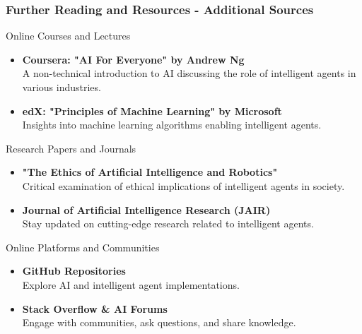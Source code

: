 \documentclass[aspectratio=169]{beamer}
\begin{document}
\begin{frame}[fragile]
  \frametitle{Further Reading and Resources - Additional Sources}
  
  \begin{block}{Online Courses and Lectures}
    \begin{itemize}
      \item \textbf{Coursera: "AI For Everyone" by Andrew Ng} \\
      A non-technical introduction to AI discussing the role of intelligent agents in various industries.
      
      \item \textbf{edX: "Principles of Machine Learning" by Microsoft} \\
      Insights into machine learning algorithms enabling intelligent agents.
    \end{itemize}
  \end{block}

  \begin{block}{Research Papers and Journals}
    \begin{itemize}
      \item \textbf{"The Ethics of Artificial Intelligence and Robotics"} \\
      Critical examination of ethical implications of intelligent agents in society.
      
      \item \textbf{Journal of Artificial Intelligence Research (JAIR)} \\
      Stay updated on cutting-edge research related to intelligent agents.
    \end{itemize}
  \end{block}

  \begin{block}{Online Platforms and Communities}
    \begin{itemize}
      \item \textbf{GitHub Repositories} \\
      Explore AI and intelligent agent implementations.
      
      \item \textbf{Stack Overflow \& AI Forums} \\
      Engage with communities, ask questions, and share knowledge.
    \end{itemize}
  \end{block}
\end{frame}
\end{document}
